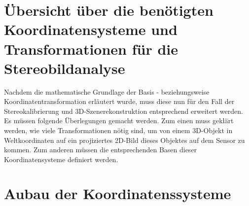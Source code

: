 \section{Übersicht über die benötigten Koordinatensysteme und Transformationen für die Stereobildanalyse}
	
Nachdem die mathematische Grundlage der Basis - beziehungsweise Koordinatentransformation erläutert wurde, muss diese nun für den Fall der Stereokalibrierung und 3D-Szenerekonstruktion entsprechend erweitert werden. Es müssen folgende Überlegungen gemacht werden. Zum einen muss geklärt werden, wie viele Transformationen nötig sind, um von einem 3D-Objekt in Weltkoordinaten auf ein projiziertes 2D-Bild dieses Objektes auf dem Sensor zu kommen. Zum anderen müssen die entsprechenden Basen dieser Koordinatensysteme definiert werden.

\section{Aubau der Koordinatenssysteme}
		

